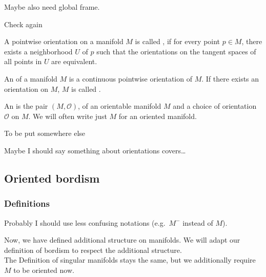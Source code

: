 \documentclass[a4paper,11pt]{article}
\begin{document}
\begin{definition}
        
\end{definition}

\begin{definition}
\end{definition}
Maybe also need global frame.

Check again
\begin{definition}
    A pointwise orientation on a manifold \(M\) is called , if for every point \(p\in M\), there exists a neighborhood \(U\) of \(p\) such that the orientations on the tangent spaces of all points in \(U\) are equivalent.
\end{definition}

\begin{definition}
    An  of a manifold \(M\) is a continuous pointwise orientation of \(M\). If there exists an orientation on \(M\), \(M\) is called .
\end{definition}

\begin{definition}
    An  is the pair \((M,\mathcal{O})\), of an orientable manifold \(M\) and a choice of orientation \(\mathcal{O}\) on \(M\).
    We will often write just \(M\) for an oriented manifold.
\end{definition}

\begin{definition}
    To be put somewhere else
\end{definition}

Maybe I should say something about orientations covers\dots

\subsection{Oriented bordism}

\subsubsection{Definitions}
Probably I should use less confusing notations (e.g.\ \(M^-\) instead of \(M\)).

Now, we have defined additional structure on manifolds.
We will adapt our definition of bordism to respect the additional structure.\\
The Definition of singular manifolds stays the same, but we additionally require \(M\) to be oriented now.
\end{document}
